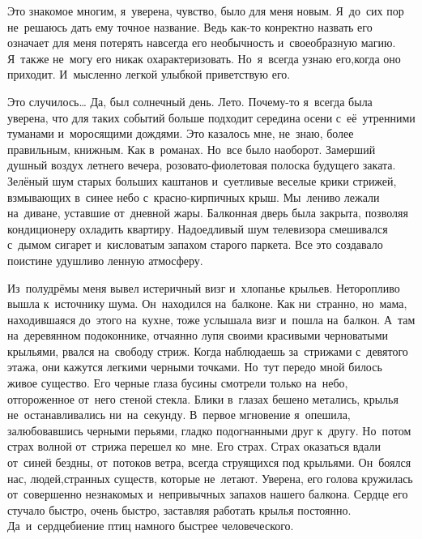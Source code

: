 \chap{***}

\lettrine[lines=3, loversize=0.1]{Э}{}то знакомое многим, я~уверена, чувство, было для меня новым.
Я~до~сих пор не~решаюсь дать ему точное название.
Ведь как-то конректно назвать его означает для меня потерять навсегда его необычность и~своеобразную магию.
Я~также не~могу его никак охарактеризовать.
Но~я~всегда узнаю его,когда оно приходит.
И~мысленно легкой улыбкой приветствую его.
 
Это случилось… 
Да, был солнечный день.
Лето.
Почему-то я~всегда была уверена, что для таких событий больше подходит середина осени с~её~утренними туманами и~моросящими дождями.
Это казалось мне, не~знаю, более правильным, книжным.
Как в~романах.
Но~все было наоборот.
Замерший душный воздух летнего вечера, розовато-фиолетовая полоска будущего заката.
Зелёный шум старых больших каштанов и~суетливые веселые крики стрижей, взмывающих в~синее небо с~красно-кирпичных крыш.
Мы~лениво лежали на~диване, уставшие от~дневной жары.
Балконная дверь была закрыта, позволяя кондиционеру охладить квартиру.
Надоедливый шум телевизора смешивался с~дымом сигарет и~кисловатым запахом старого паркета.
Все это создавало поистине удушливо ленную атмосферу.

Из~полудрёмы меня вывел истеричный визг и~хлопанье крыльев.
Неторопливо вышла к~источнику шума.
Он~находился на~балконе.
Как ни~странно, но~мама, находившаяся до~этого на~кухне, тоже услышала визг и~пошла на~балкон.
А~там на~деревянном подоконнике, отчаянно лупя своими красивыми черноватыми крыльями, рвался на~свободу стриж.
Когда наблюдаешь за~стрижами с~девятого этажа, они кажутся легкими черными точками.
Но~тут передо мной билось живое существо.
Его черные глаза бусины смотрели только на~небо, отгороженное от~него стеной стекла.
Блики в~глазах бешено метались, крылья не~останавливались ни~на~секунду.
В~первое мгновение я~опешила, залюбовавшись черными перьями, гладко подогнанными друг к~другу.
Но~потом страх волной от~стрижа перешел ко~мне.
Его страх.
Страх оказаться вдали от~синей бездны, от~потоков ветра, всегда струящихся под крыльями.
Он~боялся нас, людей,странных существ, которые не~летают.
Уверена, его голова кружилась от~совершенно незнакомых и~непривычных запахов нашего балкона.
Сердце его стучало быстро, очень быстро, заставляя работать крылья постоянно.
Да~и~сердцебиение птиц намного быстрее человеческого.

